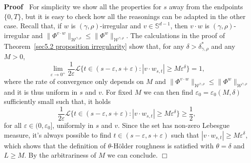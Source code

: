 \documentclass[10pt]{article}
\newcommand{\comma}{{,}}
\newcommand{\nobracket}{}
\newenvironment{proof}{\noindent\textbf{Proof\ }}{\hspace*{\fill}$\Box$\medskip}
\begin{document}
\begin{proof}
  For simplicity we show all the properties for $s$ away from the endpoints
  $\{ 0, T \}$, but it is easy to check how all the reasonings can be adapted
  in the other case. Recall that, if $w$ is $(\gamma, \rho)$\mbox{-}irregular
  and $v \in \mathbb{S}^{d - 1}$, then $v \cdot w$ is $(\gamma,
  \rho)$-irregular and $\| \Phi^{v \cdot w} \|_{\mathcal{W}^{\gamma \comma
  \rho}} \leqslant \| \Phi^w \|_{\mathcal{W}^{\gamma \comma \rho}}$. The
  calculations in the proof of Theorem~\ref{sec5.2 proposition irregularity}
  show that, for any $\delta > \delta^{\ast}_{\gamma, \rho}$ and any $M > 0$,
  \[ \lim_{\varepsilon \rightarrow 0^+} \frac{1}{2 \varepsilon} \mathcal{L} \{
     t \in (s - \varepsilon, s + \varepsilon) : | v \cdot \nobracket w_{s, t}
     | \nobracket \geqslant M \varepsilon^{\delta} \} = 1, \]
  where the rate of convergence only depends on $M$ and $\| \Phi^{v \cdot w}
  \|_{\mathcal{W}^{\gamma \comma \rho}} \leqslant \| \Phi^w
  \|_{\mathcal{W}^{\gamma \comma \rho}}$ and it is thus uniform in $s$ and
  $v$. For fixed $M$ we can then find $\varepsilon_0 = \varepsilon_0 (M,
  \delta)$ sufficiently small such that, it holds
  \[ \frac{1}{2 \varepsilon} \mathcal{L} \{ t \in (s - \varepsilon, s +
     \varepsilon) : | v \cdot w_{s, t} \nobracket | \nobracket \geqslant M
     \varepsilon^{\delta} \} \geqslant \frac{1}{2}, \]
  for all $\varepsilon \in (0, \varepsilon_0]$, uniformly in $s$ and $v$.
  Since the set has non-zero Lebesgue measure, it's always possible to find $t
  \in (s - \varepsilon, s + \varepsilon)$ such that $| v \cdot \nobracket
  w_{s, t} | \nobracket \geqslant M \varepsilon^{\delta}$, which shows that
  the definition of $\theta$\mbox{-}H\"{o}lder roughness is satisfied with
  $\theta = \delta$ and $L \geqslant M$. By the arbitrariness of $M$ we can
  conclude.
\end{proof}
\end{document}
